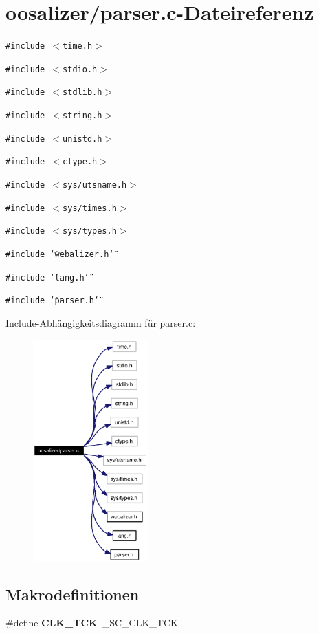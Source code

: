 \section{oosalizer/parser.c-Dateireferenz}
\label{parser_8c}
{\tt \#include $<$time.h$>$}\par
{\tt \#include $<$stdio.h$>$}\par
{\tt \#include $<$stdlib.h$>$}\par
{\tt \#include $<$string.h$>$}\par
{\tt \#include $<$unistd.h$>$}\par
{\tt \#include $<$ctype.h$>$}\par
{\tt \#include $<$sys/utsname.h$>$}\par
{\tt \#include $<$sys/times.h$>$}\par
{\tt \#include $<$sys/types.h$>$}\par
{\tt \#include \char`\"{}webalizer.h\char`\"{}}\par
{\tt \#include \char`\"{}lang.h\char`\"{}}\par
{\tt \#include \char`\"{}parser.h\char`\"{}}\par


Include-Abh\"{a}ngigkeitsdiagramm f\"{u}r parser.c:\begin{figure}[H]
\begin{center}
\leavevmode
\includegraphics[width=125pt]{parser_8c__incl}
\end{center}
\end{figure}
\subsection*{Makrodefinitionen}
\begin{CompactItemize}
\item 
\#define {\bf CLK\_\-TCK}~\_\-SC\_\-CLK\_\-TCK
\end{CompactItemize}
